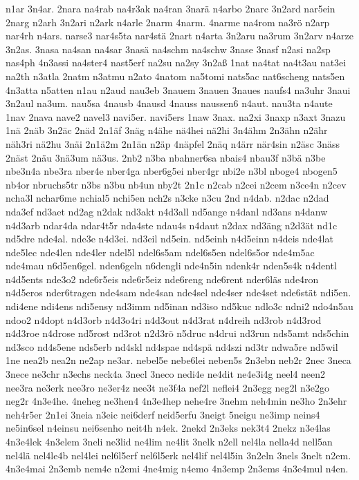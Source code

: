 {n1ar
3n4ar.
2nara
na4rab
na4r3ak
na4ran
3narä
n4arbo
2narc
3n2ard
nar5ein
2narg
n2arh
3n2ari
n2ark
n4arle
2narm
4narm.
4narme
na4rom
na3rö
n2arp
nar4rh
n4ars.
narse3
nar4s5ta
nar4stä
2nart
n4arta
3n2aru
na3rum
3n2arv
n4arze
3n2as.
3nasa
na4san
na4sar
3nasä
na4schm
na4schw
3nase
3nasf
n2asi
na2sp
nas4ph
4n3assi
na4ster4
nast5erf
na2su
na2sy
3n2aß
1nat
na4tat
na4t3au
nat3ei
na2th
n3atla
2natm
n3atmu
n2ato
4natom
na5tomi
nats5ac
nat6scheng
nats5en
4n3atta
n5atten
n1au
n2aud
nau3eb
3nauem
3nauen
3naues
naufs4
na3uhr
3naui
3n2aul
na3um.
nau5sa
4nausb
4nausd
4nauss
naussen6
n4aut.
nau3ta
n4aute
1nav
2nava
nave2
navel3
navi5er.
navi5ers
1naw
3nax.
na2xi
3naxp
n3axt
3nazu
1nä
2näb
3n2äc
2näd
2n1äf
3näg
n4ähe
nä4hei
nä2hi
3n4ähm
2n3ähn
n2ähr
näh3ri
nä2hu
3näi
2n1ä2m
2n1än
n2äp
4näpfel
2näq
n4ärr
när4sin
n2äsc
3näss
2näst
2näu
3nä3um
nä3us.
2nb2
n3ba
nbahner6sa
nbais4
nbau3f
n3bä
n3be
nbe3n4a
nbe3ra
nber4e
nber4ga
nber6g5ei
nber4gr
nbi2e
n3bl
nboge4
nbogen5
nb4or
nbruchs5tr
n3bs
n3bu
nb4un
nby2t
2n1c
n2cab
n2cei
n2cem
n3ce4n
n2cev
ncha3l
nchar6me
nchial5
nchi5en
nch2s
n3cke
n3cu
2nd
n4dab.
n2dac
n2dad
nda3ef
nd3aet
nd2ag
n2dak
nd3akt
n4d3all
nd5ange
n4danl
nd3ans
n4danw
n4d3arb
ndar4da
ndar4t5r
nda4ste
ndau4s
n4daut
n2dax
nd3äng
n2d3ät
nd1c
nd5dre
nde4al.
nde3e
n4d3ei.
nd3eil
nd5ein.
nd5einh
n4d5einn
n4deis
nde4lat
nde5lec
nde4len
nde4ler
ndel5l
ndel6s5am
ndel6s5en
ndel6s5or
nde4m5ac
nde4mau
n6d5en6gel.
nden6geln
n6dengli
nde4n5in
ndenk4r
nden5s4k
n4dentl
n4d5ents
nde3o2
nde6r5eis
nde6r5eiz
nde6reng
nde6rent
nder6läs
nde4ron
n4d5eros
nder6tragen
nde4sam
nde4san
nde4sel
nde4ser
nde4set
nde6stät
ndi5en.
ndi4ene
ndi4ens
ndi5ensy
nd3imm
nd5inan
nd3iso
nd5kuc
ndlo3c
ndni2
ndo4n5au
ndoo2
n4dopt
n4d3orb
n4d3o4ri
n4d3out
n4d3rat
n4dreih
nd3rob
n4d3rod
n4d3roe
n4drose
nd5rost
nd3rot
n2d3rö
n5druc
n4drui
nd3run
nds5amt
nds5chin
nd3sco
nd4s5ene
nds5erb
nd4skl
nd4spae
nd4spä
nd4szi
nd3tr
ndwa5re
nd5wil
1ne
nea2b
nea2n
ne2ap
ne3ar.
nebel5e
nebe6lei
neben5s
2n3ebn
neb2r
2nec
3neca
3nece
ne3chr
n3echs
neck4a
3necl
3neco
nedi4e
ne4dit
ne4e3i4g
neel4
neen2
nee3ra
ne3erk
nee3ro
ne3er4z
nee3t
ne3f4a
nef2l
neflei4
2n3egg
neg2l
n3e2go
neg2r
4n3e4he.
4neheg
ne3hen4
4n3e4hep
nehe4re
3nehm
neh4min
ne3ho
2n3ehr
neh4r5er
2n1ei
3neia
n3eic
nei6derf
neid5erfu
3neigt
5neigu
ne3imp
neins4
ne5in6sel
n4einsu
nei6senho
neit4h
n4ek.
2nekd
2n3eks
nek3t4
2nekz
n3e4las
4n3e4lek
4n3elem
3neli
ne3lid
ne4lim
ne4lit
3nelk
n2ell
nel4la
nella4d
nell5an
nel4lä
nel4le4b
nel4lei
nel6l5erf
nel6l5erk
nel4lif
nel4l5in
3n2eln
3nels
3nelt
n2em.
4n3e4mai
2n3emb
nem4e
n2emi
4ne4mig
n4emo
4n3emp
2n3ems
4n3e4mul
n4en.
}
